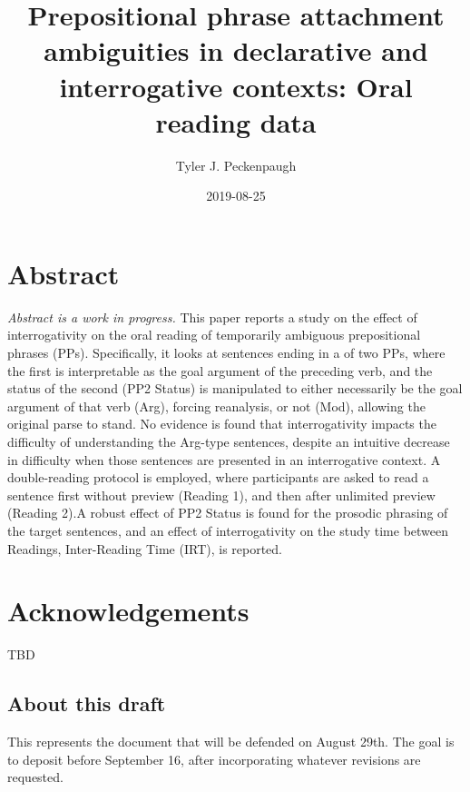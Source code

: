 \documentclass[12pt,oneside]{book}
\title{Prepositional phrase attachment ambiguities in declarative and interrogative contexts: Oral reading data}
\author{Tyler J. Peckenpaugh}
\date{2019-08-25}
\begin{document}
\maketitle

{
\setcounter{tocdepth}{1}
\tableofcontents
}
\listoftables
\listoffigures
\pagebreak

\raggedright

\hypertarget{abstract}{%
\chapter*{Abstract}\label{abstract}}

\emph{Abstract is a work in progress.} This paper reports a study on the effect of interrogativity on the oral reading of temporarily ambiguous prepositional phrases (PPs). Specifically, it looks at sentences ending in a of two PPs, where the first is interpretable as the goal argument of the preceding verb, and the status of the second (PP2 Status) is manipulated to either necessarily be the goal argument of that verb (Arg), forcing reanalysis, or not (Mod), allowing the original parse to stand. No evidence is found that interrogativity impacts the difficulty of understanding the Arg-type sentences, despite an intuitive decrease in difficulty when those sentences are presented in an interrogative context. A double-reading protocol is employed, where participants are asked to read a sentence first without preview (Reading 1), and then after unlimited preview (Reading 2).A robust effect of PP2 Status is found for the prosodic phrasing of the target sentences, and an effect of interrogativity on the study time between Readings, Inter-Reading Time (IRT), is reported.

\hypertarget{acknowledgements}{%
\chapter*{Acknowledgements}\label{acknowledgements}}

TBD

\hypertarget{about-this-draft}{%
\section*{About this draft}\label{about-this-draft}}

This represents the document that will be defended on August 29th. The goal is to deposit before September 16, after incorporating whatever revisions are requested.
\end{document}
